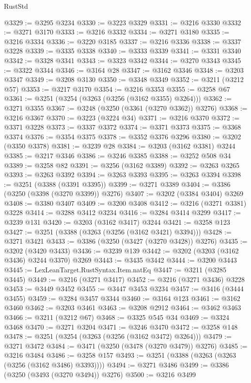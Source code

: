 \begin{lexlean}{RustStd}
\begin{coremodule}
@3329 := @3295 @3234
@3330 := @3223 @3329
@3331 := @3216 @3330
@3332 := @3271 @3170
@3333 := @3216 @3332
@3334 := @3271 @3180
@3335 := @3216 @3334
@3336 := @3220 @3185
@3337 := @3216 @3336
@3338 := @3337 @3228
@3339 := @3335 @3338
@3340 := @3333 @3339
@3341 := @3331 @3340
@3342 := @3328 @3341
@3343 := @3323 @3342
@3344 := @3270 @3343
@3345 := @3322 @3344
@3346 := @3164 @28
@3347 := @3162 @3346
@3348 := @3203 @3347
@3349 := @3208 @3130
@3350 := @3348 @3349
@3352 := @3211 (@3212 @57)
@3353 := @3217 @3170
@3354 := @3216 @3353
@3355 := @3258 @67
@3361 := @3251 (@3254 (@3263 (@3256 (@3162 @3355) @3264)))
@3362 := @3271 @3355
@3367 := @3248 (@3250 (@3361 (@3270 @3362)) @3276)
@3368 := @3216 @3367
@3370 := @3223 (@3224 @34)
@3371 := @3216 @3370
@3372 := @3371 @3228
@3373 := @3337 @3372
@3374 := @3371 @3373
@3375 := @3368 @3374
@3376 := @3354 @3375
@3378 := @3352 @3376 @3296
@3380 := @3202 (@3350 @3378)
@3381 := @3239 @28
@3384 := @3203 (@3162 @3381) @3244
@3385 := @3217 @3346
@3386 := @3246 @3385
@3388 := @3252 @508 @34
@3389 := @3258 @82
@3391 := @3256 (@3162 @3389)
@3392 := @3263 @3265
@3393 := @3263 @3392
@3394 := @3263 @3393
@3395 := @3263 @3394
@3398 := @3251 (@3388 (@3391 @3395))
@3399 := @3271 @3389
@3404 := @3386 (@3250 (@3398 (@3270 @3399)) @3276)
@3407 := @3202 (@3384 @3404) @3269
@3408 := @3380 @3407
@3409 := @3200 @3408
@3412 := @3216 (@3271 @3381) @3228
@3414 := @3288 @3412 @3234
@3416 := @3284 @3414 @3299
@3417 := @3239 @131
@3420 := @3203 (@3162 @3417) @3244
@3421 := @3258 @123
@3427 := @3251 (@3388 (@3263 (@3256 (@3162 @3421) @3394)))
@3428 := @3271 @3421
@3433 := @3386 (@3250 (@3427 (@3270 @3428)) @3276)
@3435 := @3202 (@3420 @3433)
@3436 := @3239 @139
@3442 := @3202 (@3203 (@3162 @3436) @3244 @3370) @3269
@3443 := @3435 @3442
@3444 := @3200 @3443
@3445 := LexLeanTarget.RustSyntax.Item.natEq
@3447 := @3211 (@3285 @3445)
@3449 := @3216 (@3271 @3417)
@3452 := @3216 (@3271 @3436) @3228
@3453 := @3449 @3452
@3455 := @3447 @3453 @3234
@3457 := @3416 (@3444 @3455)
@3459 := @3284 @3457 @3344
@3460 := @3164 @123
@3461 := @3162 @3460
@3462 := @3203 @3461
@3463 := @3208 @2912
@3464 := @3462 @3463
@3466 := @3211 (@3212 @67)
@3468 := @3325 @545 @34
@3469 := @3324 @3468
@3470 := @3271 @3204
@3471 := @3246 @3470
@3472 := @3258 @148
@3478 := @3251 (@3254 (@3263 (@3256 (@3162 @3472) @3264)))
@3479 := @3271 @3472
@3484 := @3471 (@3250 (@3478 (@3270 @3479)) @3276)
@3485 := @3216 @3484
@3486 := @3258 @157
@3493 := @3251 (@3388 (@3263 (@3263 (@3256 (@3162 @3486) @3393))))
@3494 := @3271 @3486
@3499 := @3386 (@3250 (@3493 (@3270 @3494)) @3276)
@3500 := @3216 @3499

\end{coremodule}
\end{lexlean}
